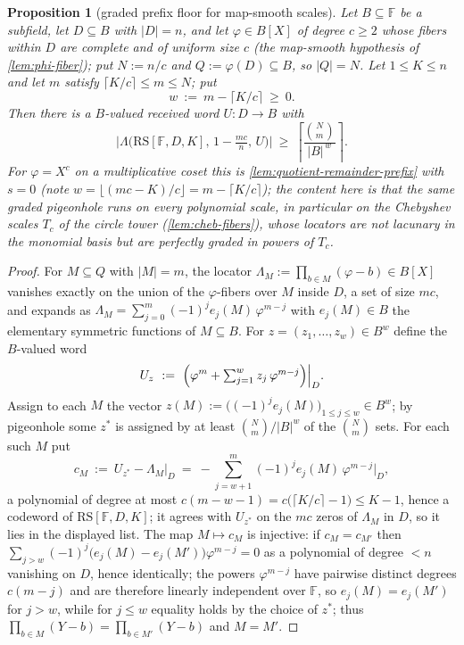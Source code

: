 \documentclass[11pt]{article}
\newtheorem{proposition}[proposition]{Proposition}
\theoremstyle{definition}
\theoremstyle{remark}
\newcommand{\F}{\mathbb{F}}
\newcommand{\B}{B}
\newcommand{\RS}{\mathrm{RS}}
\newcommand{\Lst}{\Lambda}
\begin{document}
\begin{proposition}[graded prefix floor for map-smooth scales]\label{prop:graded-prefix-floor}
Let $\B\subseteq\F$ be a subfield, let $D\subseteq\B$ with $|D|=n$, and let $\varphi\in\B[X]$ of degree $c\ge2$ whose fibers within $D$ are complete and of uniform size $c$ (the map-smooth hypothesis of \cref{lem:phi-fiber}); put $N:=n/c$ and $Q:=\varphi(D)\subseteq\B$, so $|Q|=N$. Let $1\le K\le n$ and let $m$ satisfy $\lceil K/c\rceil\le m\le N$; put
\[
w\ :=\ m-\lceil K/c\rceil\ \ge\ 0 .
\]
Then there is a $\B$-valued received word $U:D\to\B$ with
\[
\bigl|\Lst\bigl(\RS[\F,D,K],\,1-\tfrac{mc}{n},\,U\bigr)\bigr|
\ \ge\
\left\lceil\frac{\binom Nm}{|\B|^{\,w}}\right\rceil .
\]
For $\varphi=X^c$ on a multiplicative coset this is \cref{lem:quotient-remainder-prefix} with $s=0$ (note $w=\lfloor(mc-K)/c\rfloor=m-\lceil K/c\rceil$); the content here is that the same graded pigeonhole runs on every polynomial scale, in particular on the Chebyshev scales $T_c$ of the circle tower (\cref{lem:cheb-fibers}), whose locators are not lacunary in the monomial basis but are perfectly graded in powers of $T_c$.
\end{proposition}

\begin{proof}
For $M\subseteq Q$ with $|M|=m$, the locator $\Lambda_M:=\prod_{b\in M}(\varphi-b)\in\B[X]$ vanishes exactly on the union of the $\varphi$-fibers over $M$ inside $D$, a set of size $mc$, and expands as $\Lambda_M=\sum_{j=0}^m(-1)^je_j(M)\,\varphi^{m-j}$ with $e_j(M)\in\B$ the elementary symmetric functions of $M\subseteq\B$. For $z=(z_1,\dots,z_w)\in\B^w$ define the $\B$-valued word
\[
U_z\ :=\ \Bigl(\varphi^m+\textstyle\sum_{j=1}^{w}z_j\,\varphi^{m-j}\Bigr)\Big|_D .
\]
Assign to each $M$ the vector $z(M):=\bigl((-1)^je_j(M)\bigr)_{1\le j\le w}\in\B^w$; by pigeonhole some $z^*$ is assigned by at least $\binom Nm/|\B|^w$ of the $\binom Nm$ sets. For each such $M$ put
\[
c_M\ :=\ U_{z^*}-\Lambda_M\big|_D\ =\ -\sum_{j=w+1}^{m}(-1)^je_j(M)\,\varphi^{m-j}\Big|_D ,
\]
a polynomial of degree at most $c(m-w-1)=c\bigl(\lceil K/c\rceil-1\bigr)\le K-1$, hence a codeword of $\RS[\F,D,K]$; it agrees with $U_{z^*}$ on the $mc$ zeros of $\Lambda_M$ in $D$, so it lies in the displayed list. The map $M\mapsto c_M$ is injective: if $c_M=c_{M'}$ then $\sum_{j>w}(-1)^j\bigl(e_j(M)-e_j(M')\bigr)\varphi^{m-j}=0$ as a polynomial of degree $<n$ vanishing on $D$, hence identically; the powers $\varphi^{m-j}$ have pairwise distinct degrees $c(m-j)$ and are therefore linearly independent over $\F$, so $e_j(M)=e_j(M')$ for $j>w$, while for $j\le w$ equality holds by the choice of $z^*$; thus $\prod_{b\in M}(Y-b)=\prod_{b\in M'}(Y-b)$ and $M=M'$.
\end{proof}
\end{document}
